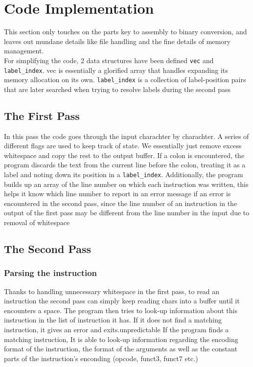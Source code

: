 \documentclass[journal,12pt,onecolumn]{IEEEtran}
\theoremstyle{remark}
\begin{document}
	\section{Code Implementation}

		This section only touches on the parts key to assembly to binary conversion, and leaves out mundane details like file handling and the fine details of memory management.\\
		For simplifying the code, 2 data structures have been defined \verb|vec| and \verb|label_index|. vec is essentially a glorified array that handles expanding its memory allocation on its own. \verb|label_index| is a collection of label-position pairs that are later searched when trying to resolve labels during the second pass

		\subsection{The First Pass}

			In this pass the code goes through the input charachter by charachter. A series of different flags are used to keep track of state.
			We essentially just remove excess whitespace and copy the rest to the output buffer. If a colon is encountered, the program discards the text from the current line before the colon, treating it as a label and noting down its position in a \verb|label_index|.
			Additionally, the program builds up an array of the line number on which each instruction was written, this helps it know which line number to report in an error message if an error is encountered in the second pass, since the line number of an instruction in the output of the first pass may be different from the line number in the input due to removal of whitespace
				
		\subsection{The Second Pass}

			\subsubsection{Parsing the instruction} \label{instruction_parse}
			Thanks to handling unnecessary whitespace in the first pass, to read an instruction the second pass can simply keep reading chars into a buffer until it encounters a space.
			The program then tries to look-up information about this instruction in the list of instruction it has. If it does not find a matching instruction, it gives an error and exits.unpredictable
			If the program finds a matching instruction, It is able to look-up information regarding the encoding format of the instruction, the format of the arguments as well as the constant parts of the instruction's enconding (opcode, funct3, funct7 etc.)
\end{document}
